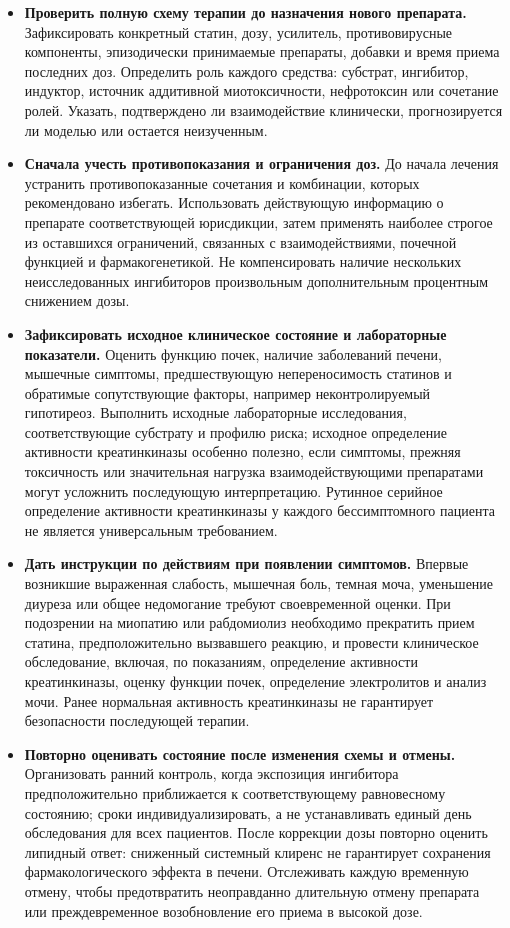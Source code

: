\documentclass[11pt]{article}
\begin{document}
\begin{itemize}
\item \textbf{Проверить полную схему терапии до назначения нового препарата.} Зафиксировать конкретный статин, дозу, усилитель, противовирусные компоненты, эпизодически принимаемые препараты, добавки и время приема последних доз. Определить роль каждого средства: субстрат, ингибитор, индуктор, источник аддитивной миотоксичности, нефротоксин или сочетание ролей. Указать, подтверждено ли взаимодействие клинически, прогнозируется ли моделью или остается неизученным.
\item \textbf{Сначала учесть противопоказания и ограничения доз.} До начала лечения устранить противопоказанные сочетания и комбинации, которых рекомендовано избегать. Использовать действующую информацию о препарате соответствующей юрисдикции, затем применять наиболее строгое из оставшихся ограничений, связанных с взаимодействиями, почечной функцией и фармакогенетикой. Не компенсировать наличие нескольких неисследованных ингибиторов произвольным дополнительным процентным снижением дозы.
\item \textbf{Зафиксировать исходное клиническое состояние и лабораторные показатели.} Оценить функцию почек, наличие заболеваний печени, мышечные симптомы, предшествующую непереносимость статинов и обратимые сопутствующие факторы, например неконтролируемый гипотиреоз. Выполнить исходные лабораторные исследования, соответствующие субстрату и профилю риска; исходное определение активности креатинкиназы особенно полезно, если симптомы, прежняя токсичность или значительная нагрузка взаимодействующими препаратами могут усложнить последующую интерпретацию. Рутинное серийное определение активности креатинкиназы у каждого бессимптомного пациента не является универсальным требованием.
\item \textbf{Дать инструкции по действиям при появлении симптомов.} Впервые возникшие выраженная слабость, мышечная боль, темная моча, уменьшение диуреза или общее недомогание требуют своевременной оценки. При подозрении на миопатию или рабдомиолиз необходимо прекратить прием статина, предположительно вызвавшего реакцию, и провести клиническое обследование, включая, по показаниям, определение активности креатинкиназы, оценку функции почек, определение электролитов и анализ мочи. Ранее нормальная активность креатинкиназы не гарантирует безопасности последующей терапии.
\item \textbf{Повторно оценивать состояние после изменения схемы и отмены.} Организовать ранний контроль, когда экспозиция ингибитора предположительно приближается к соответствующему равновесному состоянию; сроки индивидуализировать, а не устанавливать единый день обследования для всех пациентов. После коррекции дозы повторно оценить липидный ответ: сниженный системный клиренс не гарантирует сохранения фармакологического эффекта в печени. Отслеживать каждую временную отмену, чтобы предотвратить неоправданно длительную отмену препарата или преждевременное возобновление его приема в высокой дозе.

\end{itemize}
\end{document}
